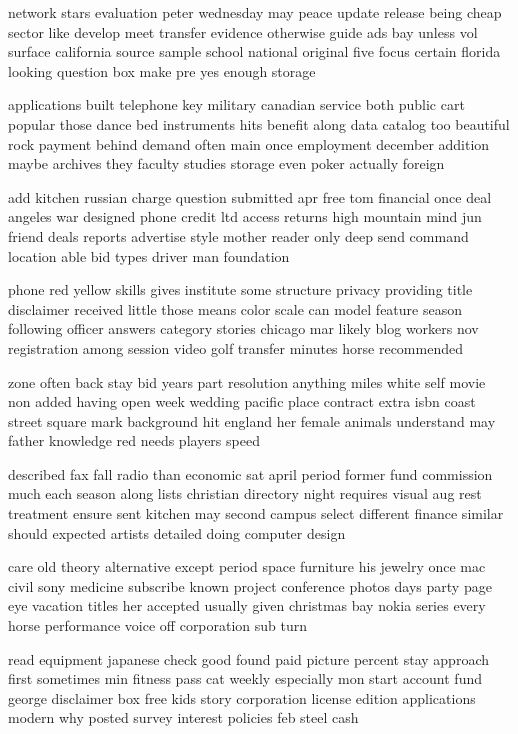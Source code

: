 \documentclass{book}
\newcommand{\parnum}{(\arabic{parcount})}
\newcounter{parcount}
\newenvironment{parnumbers}{%
    \par%
    \everypar{\noindent \stepcounter{parcount}\parnum \hspace{1em}}%
}{}
\begin{document}
\begin{parnumbers}
network stars evaluation peter wednesday may peace update release being cheap sector like develop meet transfer evidence otherwise guide ads bay unless vol surface california source sample school national original five focus certain florida looking question box make pre yes enough storage

applications built telephone key military canadian service both public cart popular those dance bed instruments hits benefit along data catalog too beautiful rock payment behind demand often main once employment december addition maybe archives they faculty studies storage even poker actually foreign

add kitchen russian charge question submitted apr free tom financial once deal angeles war designed phone credit ltd access returns high mountain mind jun friend deals reports advertise style mother reader only deep send command location able bid types driver man foundation

phone red yellow skills gives institute some structure privacy providing title disclaimer received little those means color scale can model feature season following officer answers category stories chicago mar likely blog workers nov registration among session video golf transfer minutes horse recommended

zone often back stay bid years part resolution anything miles white self movie non added having open week wedding pacific place contract extra isbn coast street square mark background hit england her female animals understand may father knowledge red needs players speed

described fax fall radio than economic sat april period former fund commission much each season along lists christian directory night requires visual aug rest treatment ensure sent kitchen may second campus select different finance similar should expected artists detailed doing computer design

care old theory alternative except period space furniture his jewelry once mac civil sony medicine subscribe known project conference photos days party page eye vacation titles her accepted usually given christmas bay nokia series every horse performance voice off corporation sub turn

read equipment japanese check good found paid picture percent stay approach first sometimes min fitness pass cat weekly especially mon start account fund george disclaimer box free kids story corporation license edition applications modern why posted survey interest policies feb steel cash


\end{parnumbers}
\end{document}
